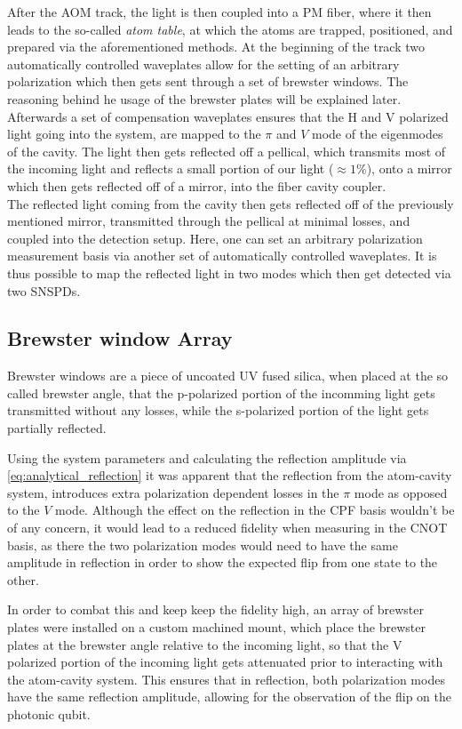 After the AOM track, the light is then coupled into a PM fiber, where it then leads to the so-called \textit{atom table}, at which the atoms are trapped, positioned, and prepared via the aforementioned methods.
At the beginning of the track two automatically controlled waveplates allow for the setting of an arbitrary polarization which then gets sent through a set of brewster windows. The reasoning behind he usage of the brewster plates will be explained later. Afterwards a set of compensation waveplates ensures that the H and V polarized light going into the system, are mapped to the $\pi$ and $V$ mode of the eigenmodes of the cavity. The light then gets reflected off a pellical, which transmits most of the incoming light and reflects a small portion of our light ($\approx 1\%$), onto a mirror which then gets reflected off of a mirror, into the fiber cavity coupler.\\

The reflected light coming from the cavity then gets reflected off of the previously mentioned mirror, transmitted through the pellical at minimal losses, and coupled into the detection setup. Here, one can set an arbitrary polarization measurement basis via another set of automatically controlled waveplates. It is thus possible to map the reflected light in two modes which then get detected via two SNSPDs.

\subsection{Brewster window Array}

Brewster windows are a piece of uncoated UV fused silica, when placed at the so called brewster angle, that the p-polarized portion of the incomming light gets transmitted without any losses, while the s-polarized portion of the light gets partially reflected.

Using the system parameters and calculating the reflection amplitude via \eqref{eq:analytical_reflection} it was apparent that the reflection from the atom-cavity system, introduces extra polarization dependent losses in the $\pi$ mode as opposed to the $V$ mode. Although the effect on the reflection in the CPF basis wouldn't be of any concern, it would lead to a reduced fidelity when measuring in the CNOT basis, as there the two polarization modes would need to have the same amplitude in reflection in order to show the expected flip from one state to the other.

In order to combat this and keep keep the fidelity high, an array of brewster plates were installed on a custom machined mount, which place the brewster plates at the brewster angle relative to the incoming light, so that the V polarized portion of the incoming light gets attenuated prior to interacting with the atom-cavity system. This ensures that in reflection, both polarization modes have the same reflection amplitude, allowing for the observation of the flip on the photonic qubit.

